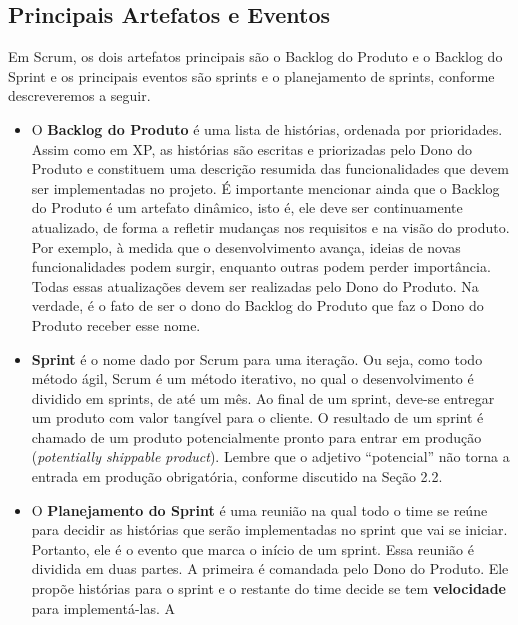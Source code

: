 \documentclass[
  11pt,
  twoside]{book}
\begin{document}
\hypertarget{principais-artefatos-e-eventos}{%
\subsection{Principais Artefatos e
Eventos}\label{principais-artefatos-e-eventos}}

Em Scrum, os dois artefatos principais são o Backlog do Produto e o
Backlog do Sprint e os principais eventos são sprints e o planejamento
de sprints, conforme descreveremos a seguir.

\begin{itemize}
\item
  O \textbf{Backlog do Produto} 
   é uma lista de histórias, ordenada
  por prioridades. Assim como em XP, as histórias são escritas e
  priorizadas pelo Dono do Produto e constituem uma descrição resumida
  das funcionalidades que devem ser implementadas no projeto. É
  importante mencionar ainda que o Backlog do Produto é um artefato
  dinâmico, isto é, ele deve ser continuamente atualizado, de forma a
  refletir mudanças nos requisitos e na visão do produto. Por exemplo, à
  medida que o desenvolvimento avança, ideias de novas funcionalidades
  podem surgir, enquanto outras podem perder importância. Todas essas
  atualizações devem ser realizadas pelo Dono do Produto. Na verdade, é
  o fato de ser o dono do Backlog do Produto que faz o Dono do Produto
  receber esse nome.
\item
  \textbf{Sprint} é o   nome dado por
  Scrum para uma iteração. Ou seja, como todo método ágil, Scrum é um
  método iterativo, no qual o desenvolvimento é dividido em sprints, de
  até um mês. Ao final de um sprint, deve-se entregar um produto com
  valor tangível para o cliente. O resultado de um sprint é chamado de
  um produto potencialmente pronto para entrar em produção
  (\emph{potentially shippable product}). Lembre que o adjetivo
  ``potencial'' não torna a entrada em produção obrigatória, conforme
  discutido na Seção 2.2.
\item
  O \textbf{Planejamento do Sprint} 
   é uma reunião na qual todo o time
  se reúne para decidir as histórias que serão implementadas no sprint
  que vai se iniciar. Portanto, ele é o evento que marca o início de um
  sprint. Essa reunião é dividida em duas partes. A primeira é comandada
  pelo Dono do Produto. Ele propõe histórias para o sprint e o restante
  do time decide se tem \textbf{velocidade} para implementá-las. A

\end{itemize}
\end{document}

